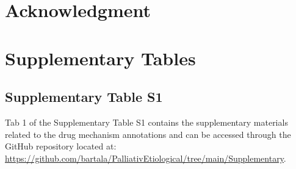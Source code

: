 \documentclass[journal,twoside,web]{ieeecolor}
\begin{document}


\section*{Acknowledgment}





\newpage
\appendices

\setcounter{figure}{0}
\renewcommand\thefigure{S\arabic{figure}} %

\section{Supplementary Tables}
\label{sec11}
\subsection{Supplementary Table S1}
Tab 1 of the Supplementary Table S1 contains the supplementary materials related to the drug mechanism annotations and can be accessed through the GitHub repository located at: \url{https://github.com/bartala/PalliativEtiological/tree/main/Supplementary}.
\end{document}
